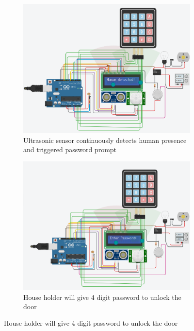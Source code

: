 \documentclass[a4paper,12pt]{article}
\begin{document}
\begin{figure}[H]
  \centering
  \begin{subfigure}{0.45\textwidth}
      \centering
      \includegraphics[width=\linewidth]{circuit_overview4.png}
      \caption{Ultrasonic sensor continuously detects human presence and triggered password prompt}
  \end{subfigure}
  \hfill
  \begin{subfigure}{0.45\textwidth}
      \centering
      \includegraphics[width=\linewidth]{circuit_overview2.png}
      \caption{House holder will give 4 digit password to unlock the door}
  \end{subfigure}
  

\end{figure}
\end{document}
